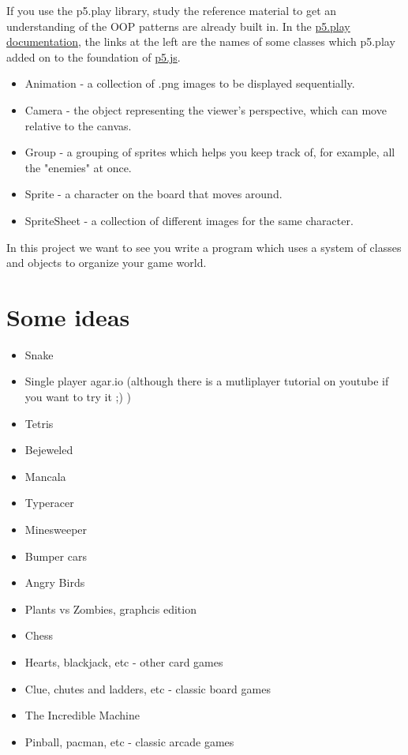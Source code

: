 \documentclass{42-en}
\begin{document}
If you use the p5.play library, study the reference material to get an understanding of the OOP patterns are already built in. In the \href{http://molleindustria.github.io/p5.play/docs/classes/p5.play.html}{p5.play documentation}, the links at the left are the names of some classes which p5.play added on to the foundation of \href{https://p5js.org/reference/}{p5.js}.
\begin{itemize}
	\item Animation - a collection of .png images to be displayed sequentially.
	\item Camera - the object representing the viewer's perspective, which can move relative to the canvas.
	\item Group - a grouping of sprites which helps you keep track of, for example, all the "enemies" at once.
	\item Sprite - a character on the board that moves around.
	\item SpriteSheet - a collection of different images for the same character.
\end{itemize}

In this project we want to see you write a program which uses a system of classes and objects to organize your game world.



\chapter{Some ideas}

\begin{itemize}

	\item Snake
	\item Single player agar.io (although there is a mutliplayer tutorial on youtube if you want to try it ;) )
	\item Tetris
	\item Bejeweled
	\item Mancala
	\item Typeracer
	\item Minesweeper
	\item Bumper cars
	\item Angry Birds
	\item Plants vs Zombies, graphcis edition
	\item Chess
	\item Hearts, blackjack, etc - other card games
	\item Clue, chutes and ladders, etc - classic board games
	\item The Incredible Machine
	\item Pinball, pacman, etc - classic arcade games

\end{itemize}
\end{document}

